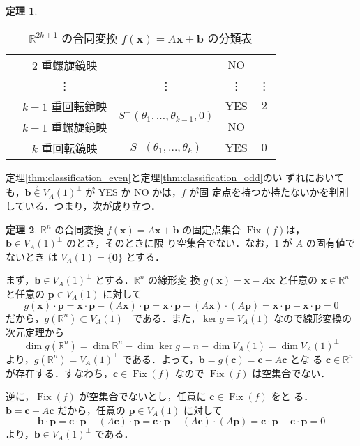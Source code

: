 \documentclass[11pt, uplatex, dvipdfmx, titlepage]{jsarticle}
\makeatletter
\DeclareMathOperator{\Fix}{Fix}
\renewenvironment{proof}[1][\proofname]{\par
  \pushQED{\qed}%
  \normalfont \topsep6\p@\@plus6\p@\relax
  \trivlist
  \item[\hskip\labelsep
         \bfseries
    {#1}]\ignorespaces
}{%
  \popQED\endtrivlist\@endpefalse
}
\theoremstyle{definition}
\newtheorem{theorem}{定理}[section]
\renewcommand{\proofname}{\textbf{証明}}
\makeatother
\begin{document}
\begin{theorem}
\begin{table}[h]
\begin{tabular}[h]{c|c|c|c|c}
             & $2$ 重螺旋鏡映 & & NO & --  \\ \cline{2-5}
             & \vdots & \vdots & \vdots & \vdots\\ \cline{2-5}
             & $k-1$ 重回転鏡映 & \multirow{2}{*}{$S^{-}(\theta_1, \ldots, \theta_{k-1},0)$} & YES & $2$\\
             & $k-1$ 重螺旋鏡映 & & NO & -- \\ \cline{2-5}
             & $k$ 重回転鏡映 & $S^{-}(\theta_1, \ldots, \theta_k)$ & YES & $0$
    \end{tabular}
    \caption{$\mathbb{R}^{2k+1}$ の合同変換 $f(\bm{x}) = A\bm{x} + \bm{b}$ の分類表}
    \label{tab:classification_odd}
  \end{table}

\end{theorem}

定理\ref{thm:classification_even}と定理\ref{thm:classification_odd}のい
ずれにおいても，$\bm{b} \overset{?}{\in} V_A(1)^{\perp}$ が YES か NO かは，$f$ が固
定点を持つか持たないかを判別している．つまり，次が成り立つ．

\begin{theorem}\label{thm:exist_fixed}
  $\mathbb{R}^n$ の合同変換 $f(\bm{x}) = A\bm{x} +
  \bm{b}$ の固定点集合 $\Fix(f)$は，$\bm{b} \in V_A(1)^{\perp}$ のとき，そのときに限
  り空集合でない．なお，$1$ が $A$ の固有値でないとき
  は $V_A(1) = \{\bm{0}\}$ とする．
\end{theorem}

\begin{proof}
  まず，$\bm{b} \in V_A(1)^{\perp}$ とする．$\mathbb{R}^n$ の線形変
  換 $g(\bm{x}) = \bm{x} - A\bm{x}$ と任意の $\bm{x} \in
  \mathbb{R}^n$ と任意の $\bm{p} \in V_A(1)$ に対して
  \[
    g(\bm{x}) \cdot \bm{p} = \bm{x} \cdot \bm{p} - (A\bm{x}) \cdot
    \bm{p} = \bm{x}\cdot \bm{p} - (A\bm{x}) \cdot (A\bm{p}) = \bm{x} \cdot \bm{p} - \bm{x} \cdot \bm{p} = 0
  \]
  だから，$g(\mathbb{R}^n) \subset V_A(1)^{\perp}$
  である．また，$\ker g = V_A(1)$ なので線形変換の次元定理から
  \[
    \dim g(\mathbb{R}^n) = \dim \mathbb{R}^n - \dim \ker g = n - \dim V_A(1) = \dim V_A(1)^{\perp}
  \]
  より，$g(\mathbb{R}^n) = V_A(1)^{\perp}$
  である．よって，$\bm{b} = g(\bm{c}) = \bm{c} - A\bm{c}$ とな
  る $\bm{c} \in \mathbb{R}^n$ が存在する．すなわち，$\bm{c} \in
  \Fix(f)$ なので $\Fix(f)$ は空集合でない．

  逆に，$\Fix(f)$ が空集合でないとし，任意に $\bm{c} \in \Fix(f)$ をと
  る．$\bm{b} = \bm{c} - A\bm{c}$ だから，任意の $\bm{p} \in V_A(1)$ に対して
  \[
    \bm{b} \cdot \bm{p} = \bm{c} \cdot \bm{p} - (A\bm{c}) \cdot \bm{p}
    = \bm{c} \cdot \bm{p} - (A\bm{c}) \cdot (A\bm{p}) = \bm{c} \cdot
    \bm{p} - \bm{c} \cdot \bm{p}=0
  \]
  より，$\bm{b} \in V_A(1)^{\perp}$ である．
\end{proof}
\end{document}
